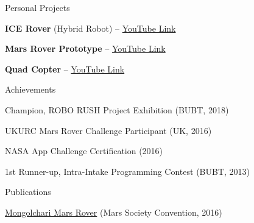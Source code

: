 \documentclass{resume}
\begin{document}
    \begin{rSection}{Personal Projects}

        \item \textbf{ICE Rover} (Hybrid Robot) – \href{https://www.youtube.com/watch?v=-xZL5QeMJOA}{YouTube Link}
        \item \textbf{Mars Rover Prototype} – \href{https://www.youtube.com/watch?v=Ezm-PA_P74U}{YouTube Link}
        \item \textbf{Quad Copter} – \href{https://www.youtube.com/watch?v=P7Kv3u3oT5Q}{YouTube Link}

    \end{rSection}

    \begin{rSection}{Achievements}
        \itemsep -2pt
        \item Champion, ROBO RUSH Project Exhibition (BUBT, 2018)
        \item UKURC Mars Rover Challenge Participant (UK, 2016)
        \item NASA App Challenge Certification (2016)
        \item 1st Runner-up, Intra-Intake Programming Contest (BUBT, 2013)
    \end{rSection}

    \begin{rSection}{Publications}
        \item \href{http://www.marspapers.org/paper/Sakib_2016.pdf}{Mongolchari Mars Rover} (Mars Society Convention, 2016)
    \end{rSection}
\end{document}

